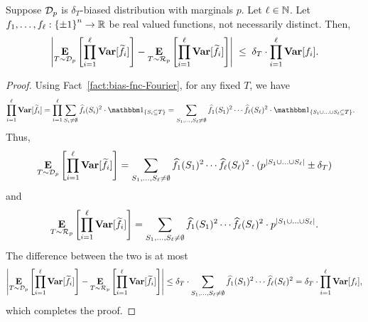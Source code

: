 \begin{lemma}\label{lemma:vars_prod}
	Suppose ${\mathcal{D}}_p$ is $\delta_T$-biased distribution with marginals $p$.
Let $\ell \in {\mathbb{N}}$.
Let $f_1, \ldots, f_\ell: {\{\pm1\}}^n \to {\mathbb{R}}$ be real valued functions, not necessarily distinct.
Then, $$\left|\mathop{\bf E\/}_{T \sim {\mathcal{D}}_p}\left[ \prod_{i=1}^{\ell} {\mathop{\bf Var\/}}[\widetilde{f_i}] \right] - 
\mathop{\bf E\/}_{T \sim \mathcal{R}_p}\left[ \prod_{i=1}^{\ell} {\mathop{\bf Var\/}}[\widetilde{f_i}]\right]\right| \;\le  \;\delta_T \cdot\prod_{i=1}^{\ell} {\mathop{\bf Var\/}}[f_i].$$
\end{lemma}
\begin{proof}
Using Fact~\ref{fact:bias-fnc-Fourier}, for any fixed $T$, we have
\begin{align*}
\prod_{i=1}^{\ell} \var[\tilde{f_i}] &= 
\prod_{i=1}^{\ell} \sum_{S_i \neq \emptyset} \hat{f_i}(S_i)^2 \cdot \one_{\{S_i \subseteq T\}}	= \sum_{S_1, \ldots, S_{\ell} \neq \emptyset} \hat{f_1}(S_1)^2 \cdots \hat{f_\ell}(S_\ell)^2 \cdot \one_{\{S_1 \cup \ldots \cup S_{\ell} \subseteq T\}}.
\end{align*}
Thus,
\begin{align*}
\mathop{\bf E\/}_{T \sim {\mathcal{D}}_p}\left[ \prod_{i=1}^{\ell} {\mathop{\bf Var\/}}[\widetilde{f_i}]\right] = \sum_{S_1, \ldots, S_{\ell} \neq \emptyset} \widehat{f_1}(S_1)^2 \cdots \widehat{f_\ell}(S_\ell)^2 \cdot (p^{|S_1 \cup \ldots \cup S_{\ell}|} \pm \delta_T)
\end{align*}
and 
\begin{align*}
\mathop{\bf E\/}_{T \sim \mathcal{R}_p}\left[ \prod_{i=1}^{\ell} {\mathop{\bf Var\/}}[\widetilde{f_i}]\right] = \sum_{S_1, \ldots, S_{\ell} \neq \emptyset} \widehat{f_1}(S_1)^2 \cdots \widehat{f_\ell}(S_\ell)^2 \cdot p^{|S_1 \cup \ldots \cup S_{\ell}|}.
\end{align*}
The difference between the two is at most 
$$\left|\mathop{\bf E\/}_{T \sim {\mathcal{D}}_p}\left[ \prod_{i=1}^{\ell} {\mathop{\bf Var\/}}[\widetilde{f_i}]\right] -  \mathop{\bf E\/}_{T \sim \mathcal{R}_p}\left[ \prod_{i=1}^{\ell} {\mathop{\bf Var\/}}[\widetilde{f_i}]\right]\right| \le \delta_T \cdot \sum_{S_1, \ldots, S_{\ell} \neq \emptyset} \widehat{f_1}(S_1)^2 \cdots \widehat{f_\ell}(S_\ell)^2 = \delta_T \cdot \prod_{i=1}^{\ell} {\mathop{\bf Var\/}}[f_i],$$
which completes the proof.
%
%
%
\end{proof}
